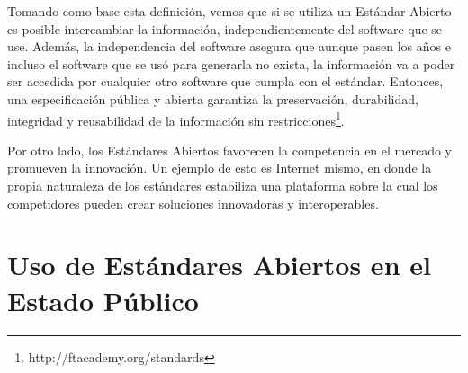 \documentclass[12pt]{article}
\begin{document}
Tomando como base esta definición, vemos que si se utiliza un Estándar Abierto es posible intercambiar la información, independientemente del software que se use. Además, la independencia del software asegura que aunque pasen los años e incluso el software que se usó para generarla no exista, la información va a poder ser accedida por cualquier otro software que cumpla con el estándar. Entonces, una especificación pública y abierta garantiza la preservación, durabilidad, integridad y reusabilidad de la información sin restricciones\footnote{http://ftacademy.org/standards}. 

Por otro lado, los Estándares Abiertos favorecen la competencia en el mercado y promueven la innovación. Un ejemplo de esto es Internet mismo, en donde la propia naturaleza de los estándares estabiliza una plataforma sobre la cual los competidores pueden crear soluciones innovadoras y interoperables. 
 
\section*{Uso de Estándares Abiertos en el Estado Público}
\end{document}
